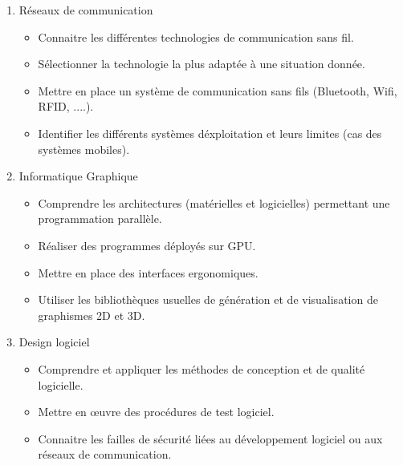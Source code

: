 



{
\begin{enumerate}
\item Réseaux de communication
 \begin{itemize}
 \item Connaitre les différentes technologies de communication sans fil.
 \item Sélectionner la technologie la plus adaptée à une situation donnée.
 \item Mettre en place un système de communication sans fils (Bluetooth, Wifi, RFID, ....).
 \item Identifier les différents systèmes d\'exploitation et leurs limites (cas des systèmes mobiles).
 \end{itemize} 
\item Informatique Graphique
 \begin{itemize}
 \item Comprendre les architectures (matérielles et logicielles) permettant une programmation parallèle.
 \item Réaliser des programmes déployés sur GPU.
 \item Mettre en place des interfaces ergonomiques.
 \item Utiliser les bibliothèques usuelles de génération et de visualisation de graphismes 2D et 3D.
 \end{itemize} 
\item Design logiciel
 \begin{itemize}
 \item Comprendre et appliquer les méthodes de conception et de qualité logicielle.
 \item Mettre en \oe uvre des procédures de test logiciel.
 \item Connaitre les failles de sécurité liées au développement logiciel ou aux réseaux de communication.
 \end{itemize}
\end{enumerate}
} 

